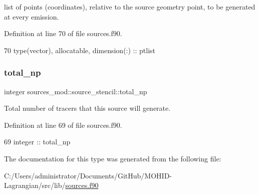 list of points (coordinates), relative to the source geometry point, to be generated at every emission. 



Definition at line 70 of file sources.\+f90.


\begin{DoxyCode}
70         \textcolor{keywordtype}{type}(vector), \textcolor{keywordtype}{allocatable}, \textcolor{keywordtype}{dimension(:)} :: ptlist
\end{DoxyCode}
\mbox{\label{structsources__mod_1_1source__stencil_ad7373d51bdf50a4595b6c0fa69f7f915}} 
\subsubsection{\texorpdfstring{total\+\_\+np}{total\_np}}
{\footnotesize\ttfamily integer sources\+\_\+mod\+::source\+\_\+stencil\+::total\+\_\+np\hspace{0.3cm}{\ttfamily [private]}}



Total number of tracers that this source will generate. 



Definition at line 69 of file sources.\+f90.


\begin{DoxyCode}
69         \textcolor{keywordtype}{integer} :: total\_np
\end{DoxyCode}


The documentation for this type was generated from the following file\+:\begin{DoxyCompactItemize}
\item 
C\+:/\+Users/administrator/\+Documents/\+Git\+Hub/\+M\+O\+H\+I\+D-\/\+Lagrangian/src/lib/\mbox{\hyperlink{sources_8f90}{sources.\+f90}}\end{DoxyCompactItemize}
